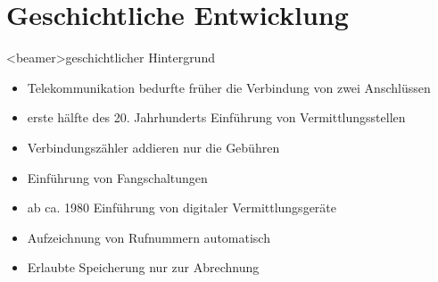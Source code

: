 
\section{Geschichtliche Entwicklung}
    \begin{frame}<beamer>{geschichtlicher Hintergrund}
      \begin{itemize}
        \item
          Telekommunikation bedurfte früher die Verbindung von zwei Anschlüssen
        \item
          erste hälfte des 20. Jahrhunderts Einführung von Vermittlungsstellen
        \item
          Verbindungszähler addieren nur die Gebühren
        \item
          Einführung von Fangschaltungen
        \item 
         ab ca. 1980 Einführung von digitaler Vermittlungsgeräte
        \item
          Aufzeichnung von Rufnummern automatisch
        \item
          Erlaubte Speicherung nur zur Abrechnung


      \end{itemize}
    \end{frame}

